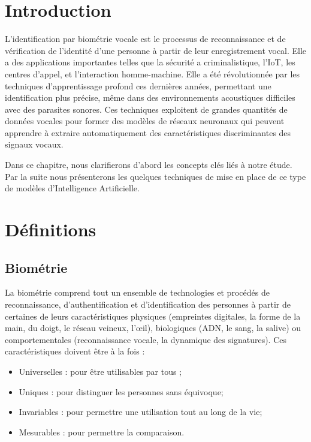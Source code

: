\section*{Introduction}
L’identification par biométrie vocale est le processus de reconnaissance et de vérification de l’identité d’une personne à partir de leur enregistrement vocal. Elle a des applications importantes telles que la sécurité a criminalistique, l’IoT, les centres d’appel, et l’interaction homme-machine. Elle a été révolutionnée par les techniques d’apprentissage profond ces dernières années, permettant une identification plus précise, même dans des environnements acoustiques difficiles avec des parasites sonores. Ces techniques exploitent de grandes quantités de données vocales pour former des modèles de réseaux neuronaux qui peuvent apprendre à extraire automatiquement des caractéristiques discriminantes des signaux vocaux.

Dans ce chapitre, nous clarifierons d’abord les concepts clés liés à notre étude. Par la suite nous présenterons les quelques techniques de mise en place de ce type de modèles d’Intelligence Artificielle.

\section{Définitions}
\subsection{Biométrie}

La biométrie comprend tout un ensemble de technologies et procédés de reconnaissance, d’authentification et d’identification des personnes à partir de certaines de leurs caractéristiques physiques (empreintes digitales, la forme de la main, du doigt, le réseau veineux, l'œil), biologiques (ADN, le sang, la salive) ou comportementales (reconnaissance vocale, la dynamique des signatures). Ces caractéristiques doivent être à la fois \cite{idemia} :	
\begin{itemize}
    \item Universelles : pour être utilisables par tous ; 
    \item Uniques : pour distinguer les personnes sans équivoque;
    \item Invariables : pour permettre une utilisation tout au long de la vie;
    \item Mesurables : pour permettre la comparaison.
\end{itemize}

